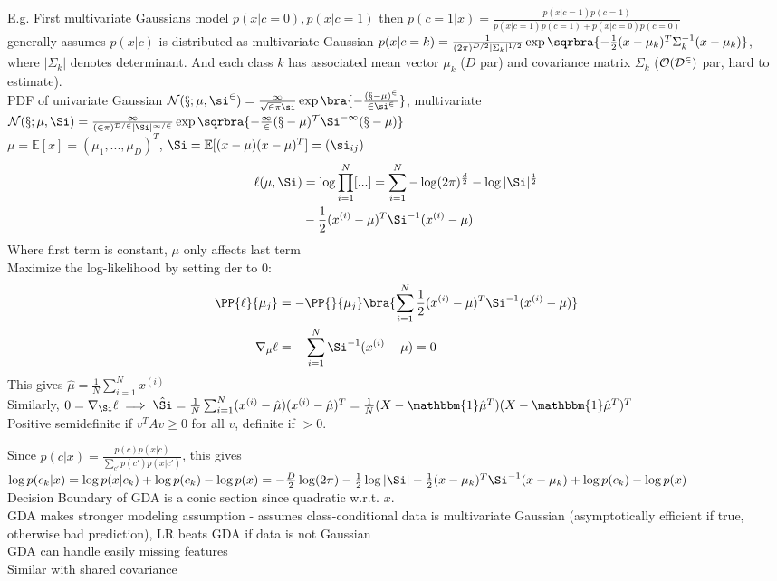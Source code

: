 \documentclass[10pt]{CheatSheet/hw}
\begin{document}
\begin{multicols*}{5}
E.g. First multivariate Gaussians model $p(x|c=0), p(x|c=1)$ then $p(c=1|x)=\frac{p(x|c=1)p(c=1)}{p(x|c=1)p(c=1)+p(x|c=0)p(c=0)}$\\
 generally assumes $p(x|c)$ is distributed as multivariate Gaussian $p(x|c=k)=\frac1{(2\pi)^{D/2}|\Sigma_k|^{1/2}}\exp\sqrbra{-\frac12(x-\mu_k)^T\Sigma_k^{-1}(x-\mu_k)}$, where $|\Sigma_k|$ denotes determinant. And each class $k$ has associated mean vector $\mu_k$ ($D$ par) and covariance matrix $\Sigma_k$ ($\cal{O}(D^2)$ par, hard to estimate).\\
PDF of univariate Gaussian $\cal{N}(x;\mu,\si^2)=\frac1{\sqrt{2\pi}\si}\exp\bra{-\frac{(x-\mu)^2}{2\si^2}}$, multivariate $\cal{N}(x;\mu,\Si)=\frac{1}{(2\pi)^{D/2}|\Si|^{1/2}}\exp\sqrbra{-\frac12(x-\mu)^T\Si^{-1}(x-\mu)}$\\
$\mu=\mathbb{E}[x]=(\mu_1,...,\mu_D)^T$, $\Si=\mathbb{E}[(x-\mu)(x-\mu)^T]=(\si_{ij})$\\
\begin{align*}
    \ell(\mu,\Si)&=\log\prod_{i=1}^N[...]=\sum_{i=1}^N -\log(2\pi)^{\frac{d}2}-\log|\Si|^{\frac12}\\
    &-\frac12(x^{(i)}-\mu)^T\Si^{-1}(x^{(i)}-\mu)
\end{align*} 
Where first term is constant, $\mu$ only affects last term\\
Maximize the log-likelihood by setting der to 0:
\begin{align*}
    \PP{\ell}{\mu_j}&=-\PP{}{\mu_j}\bra{\sum_{i=1}^N\frac12(x^{(i)}-\mu)^T\Si^{-1}(x^{(i)}-\mu)}\\
    \nabla_\mu\ell&=-\sum_{i=1}^N\Si^{-1}(x^{(i)}-\mu)=0
\end{align*}
This gives $\hat{\mu}=\frac1N\sum_{i=1}^N x^{(i)}$\\
Similarly, $0=\nabla_\Si\ell\implies\hat{\Si}=\frac1N\sum_{i=1}^N(x^{(i)}-\hat{\mu})(x^{(i)}-\hat{\mu})^T=\frac1N(X-\mathbbm{1}\hat{\mu}^T)(X-\mathbbm{1}\hat{\mu}^T)^T$\\
Positive semidefinite if $v^TAv\ge0$ for all $v$, definite if $>0$.

Since $p(c|x)=\frac{p(c)p(x|c)}{\sum_{c'}p(c')p(x|c')}$, this gives $\log p(c_k|x)=\log p(x|c_k)+\log p(c_k)-\log p(x)=-\frac{D}2\log(2\pi)-\frac12\log|\Si|-\frac12(x-\mu_k)^T\Si^{-1}(x-\mu_k)+\log p(c_k)-\log p(x)$\\
Decision Boundary of GDA is a conic section since quadratic w.r.t. $x$.\\
GDA makes stronger modeling assumption - assumes class-conditional data is multivariate Gaussian (asymptotically efficient if true, otherwise bad prediction), LR beats GDA if data is not Gaussian\\
GDA can handle easily missing features\\
Similar with shared covariance


\end{multicols*}
\end{document}
